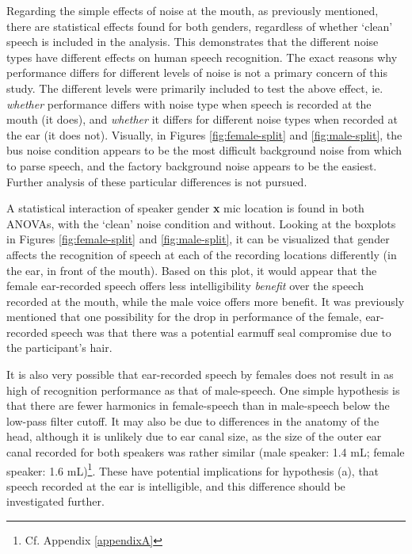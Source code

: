 Regarding the simple effects of noise at the mouth, as previously mentioned, there are statistical effects found for both genders, regardless of whether `clean' speech is included in the analysis.  This demonstrates that the different noise types have different effects on human speech recognition.  The exact reasons why performance differs for different levels of noise is not a primary concern of this study.  The different levels were primarily included to test the above effect, ie. \textit{whether} performance differs with noise type when speech is recorded at the mouth (it does), and \textit{whether} it differs for different noise types when recorded at the ear (it does not).   Visually, in Figures \ref{fig:female-split} and \ref{fig:male-split}, the bus noise condition appears to be the most difficult background noise from which to parse speech, and the factory background noise appears to be the easiest.  Further analysis of these particular differences is not pursued.



A statistical interaction of speaker gender \textbf{x} mic location is found in both ANOVAs, with the `clean' noise condition and without.  
Looking at the boxplots in Figures \ref{fig:female-split} and \ref{fig:male-split}, it can be visualized that gender affects the recognition of speech at each of the recording locations differently (in the ear, in front of the mouth).  Based on this plot, it would appear that the female ear-recorded speech offers less intelligibility \textit{benefit} over the speech recorded at the mouth, while the male voice offers more benefit. It was previously mentioned that one possibility for the drop in performance of the female, ear-recorded speech was that there was a potential earmuff seal compromise due to the participant's hair.  

It is also very possible that ear-recorded speech by females does not result in as high of recognition performance as that of male-speech.  One simple hypothesis is that there are fewer harmonics in female-speech than in male-speech below the low-pass filter cutoff.  It may also be due to differences in the anatomy of the head, although it is unlikely due to ear canal size, as the size of the outer ear canal recorded for both speakers was rather similar (male speaker: 1.4 mL; female speaker: 1.6 mL)\footnote{Cf. Appendix \ref{appendixA}}.  These have potential implications for hypothesis (a), that speech recorded at the ear is intelligible, and this difference should be investigated further.
%
%

